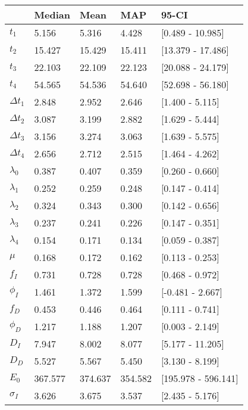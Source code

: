 \begin{tabular}{lllll}
\toprule
{} &   Median &     Mean &      MAP &                95-CI \\
\midrule
$t_1$        &    5.156 &    5.316 &    4.428 &     [0.489 - 10.985] \\
$t_2$        &   15.427 &   15.429 &   15.411 &    [13.379 - 17.486] \\
$t_3$        &   22.103 &   22.109 &   22.123 &    [20.088 - 24.179] \\
$t_4$        &   54.565 &   54.536 &   54.640 &    [52.698 - 56.180] \\
$\Delta t_1$ &    2.848 &    2.952 &    2.646 &      [1.400 - 5.115] \\
$\Delta t_2$ &    3.087 &    3.199 &    2.882 &      [1.629 - 5.444] \\
$\Delta t_3$ &    3.156 &    3.274 &    3.063 &      [1.639 - 5.575] \\
$\Delta t_4$ &    2.656 &    2.712 &    2.515 &      [1.464 - 4.262] \\
$\lambda_0$  &    0.387 &    0.407 &    0.359 &      [0.260 - 0.660] \\
$\lambda_1$  &    0.252 &    0.259 &    0.248 &      [0.147 - 0.414] \\
$\lambda_2$  &    0.324 &    0.343 &    0.300 &      [0.142 - 0.656] \\
$\lambda_3$  &    0.237 &    0.241 &    0.226 &      [0.147 - 0.351] \\
$\lambda_4$  &    0.154 &    0.171 &    0.134 &      [0.059 - 0.387] \\
$\mu$        &    0.168 &    0.172 &    0.162 &      [0.113 - 0.253] \\
$f_I$        &    0.731 &    0.728 &    0.728 &      [0.468 - 0.972] \\
$\phi_I$     &    1.461 &    1.372 &    1.599 &     [-0.481 - 2.667] \\
$f_D$        &    0.453 &    0.446 &    0.464 &      [0.111 - 0.741] \\
$\phi_D$     &    1.217 &    1.188 &    1.207 &      [0.003 - 2.149] \\
$D_I$        &    7.947 &    8.002 &    8.077 &     [5.177 - 11.205] \\
$D_D$        &    5.527 &    5.567 &    5.450 &      [3.130 - 8.199] \\
$E_0$        &  367.577 &  374.637 &  354.582 &  [195.978 - 596.141] \\
$\sigma_I$   &    3.626 &    3.675 &    3.537 &      [2.435 - 5.176] \\

\end{tabular}
